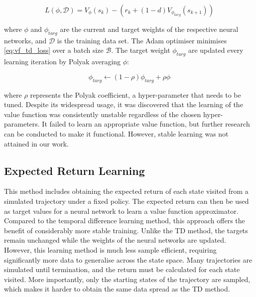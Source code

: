 \begin{equation}\label{eq:vf_td_loss}
    L(\phi, \mathcal{D}) =  V_{\phi}(s_k) - (r_k + (1-d) V_{\phi_{targ}} (s_{k+1}))
\end{equation}

where  $\phi$ and $\phi_{targ}$ are the current and target weights of the respective neural networks, and $\mathcal{D}$ is the training data set. The Adam optimiser minimises \autoref{eq:vf_td_loss} over a batch size $\mathcal{B}$. The target weight $\phi_{targ}$ are updated every learning iteration by Polyak averaging $\phi$:

\begin{equation}
    \phi_{targ} \leftarrow (1 - \rho) \phi_{targ} + \rho \phi
\end{equation}

where $\rho$ represents the Polyak coefficient, a hyper-parameter that needs to be tuned. Despite its widespread usage, it was discovered that the learning of the value function was consistently unstable regardless of the chosen hyper-parameters. It failed to learn an appropriate value function, but further research can be conducted to make it functional. However, stable learning was not attained in our work.

\subsection{Expected Return Learning}
This method includes obtaining the expected return of each state visited from a simulated trajectory under a fixed policy. The expected return can then be used as target values for a neural network to learn a value function approximator. Compared to the temporal difference learning method, this approach offers the benefit of considerably more stable training. Unlike the TD method, the targets remain unchanged while the weights of the neural networks are updated. However, this learning method is much less sample efficient, requiring significantly more data to generalise across the state space. Many trajectories are simulated until termination, and the return must be calculated for each state visited. More importantly, only the starting states of the trajectory are sampled, which makes it harder to obtain the same data spread as the TD method.

